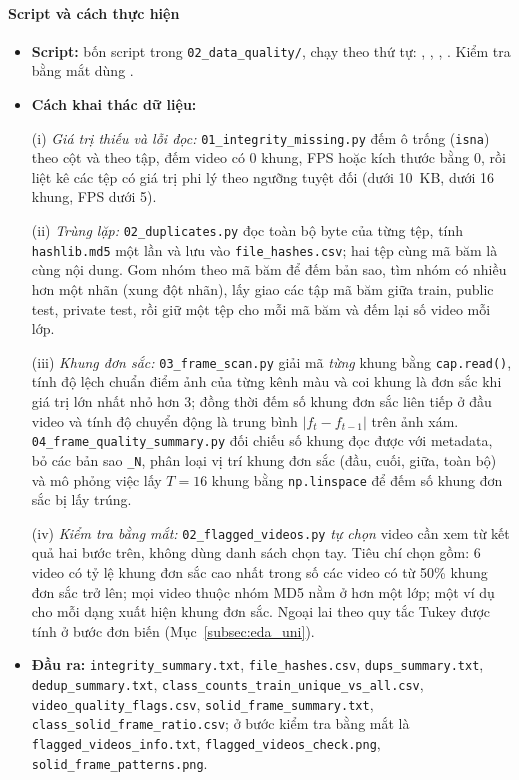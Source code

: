 \paragraph{Script và cách thực hiện}
\begin{itemize}
  \item \textbf{Script:} bốn script trong \texttt{02\_data\_quality/}, chạy theo thứ tự: , , , . Kiểm tra bằng mắt dùng .
  \item \textbf{Cách khai thác dữ liệu:} 
  
  (i) \emph{Giá trị thiếu và lỗi đọc:} \texttt{01\_integrity\_missing.py} đếm ô trống (\texttt{isna}) theo cột và theo tập, đếm video có 0 khung, FPS hoặc kích thước bằng 0, rồi liệt kê các tệp có giá trị phi lý theo ngưỡng tuyệt đối (dưới 10~KB, dưới 16 khung, FPS dưới 5). 
  
  (ii) \emph{Trùng lặp:} \texttt{02\_duplicates.py} đọc toàn bộ byte của từng tệp, tính \texttt{hashlib.md5} một lần và lưu vào \texttt{file\_hashes.csv}; hai tệp cùng mã băm là cùng nội dung. Gom nhóm theo mã băm để đếm bản sao, tìm nhóm có nhiều hơn một nhãn (xung đột nhãn), lấy giao các tập mã băm giữa train, public test, private test, rồi giữ một tệp cho mỗi mã băm và đếm lại số video mỗi lớp. 
  
  (iii) \emph{Khung đơn sắc:} \texttt{03\_frame\_scan.py} giải mã \emph{từng} khung bằng \texttt{cap.read()}, tính độ lệch chuẩn điểm ảnh của từng kênh màu và coi khung là đơn sắc khi giá trị lớn nhất nhỏ hơn 3; đồng thời đếm số khung đơn sắc liên tiếp ở đầu video và tính độ chuyển động là trung bình $|f_t-f_{t-1}|$ trên ảnh xám. \texttt{04\_frame\_quality\_summary.py} đối chiếu số khung đọc được với metadata, bỏ các bản sao \texttt{\_N}, phân loại vị trí khung đơn sắc (đầu, cuối, giữa, toàn bộ) và mô phỏng việc lấy $T=16$ khung bằng \texttt{np.linspace} để đếm số khung đơn sắc bị lấy trúng. 
  
  (iv) \emph{Kiểm tra bằng mắt:} \texttt{02\_flagged\_videos.py} \emph{tự chọn} video cần xem từ kết quả hai bước trên, không dùng danh sách chọn tay. Tiêu chí chọn gồm: 6 video có tỷ lệ khung đơn sắc cao nhất trong số các video có từ 50\% khung đơn sắc trở lên; mọi video thuộc nhóm MD5 nằm ở hơn một lớp; một ví dụ cho mỗi dạng xuất hiện khung đơn sắc. Ngoại lai theo quy tắc Tukey được tính ở bước đơn biến (Mục~\ref{subsec:eda_uni}).
  \item \textbf{Đầu ra:} \texttt{integrity\_summary.txt}, \texttt{file\_hashes.csv}, \texttt{dups\_summary.txt}, \texttt{dedup\_summary.txt}, \texttt{class\_counts\_train\_unique\_vs\_all.csv}, \texttt{video\_quality\_flags.csv}, \texttt{solid\_frame\_summary.txt}, \texttt{class\_solid\_frame\_ratio.csv}; ở bước kiểm tra bằng mắt là \texttt{flagged\_videos\_info.txt}, \texttt{flagged\_videos\_check.png}, \texttt{solid\_frame\_patterns.png}.
\end{itemize}

